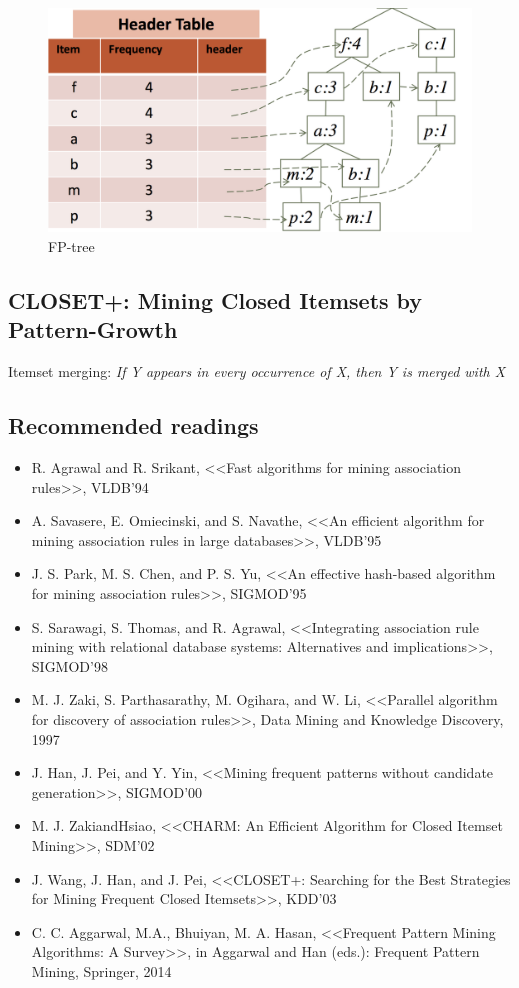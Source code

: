 \begin{figure}[H]
    \centering
    \includegraphics[width=\linewidth]{fptree.png}
    \caption{FP-tree}
\end{figure}

\subsection{CLOSET+: Mining Closed Itemsets by Pattern-Growth}
Itemset merging: \textit{If Y appears in every occurrence of X, then Y
is merged with X}

\subsection{Recommended readings}
\begin{itemize}
\item R. Agrawal and R. Srikant, <<Fast algorithms for mining association rules>>, VLDB'94
\item A. Savasere, E. Omiecinski, and S. Navathe, <<An efficient algorithm for mining association rules in large
databases>>, VLDB'95
\item J. S. Park, M. S. Chen, and P. S. Yu, <<An effective hash-based algorithm for mining association rules>>, SIGMOD'95
\item S. Sarawagi, S. Thomas, and R. Agrawal, <<Integrating association rule mining with relational database systems: Alternatives and implications>>, SIGMOD'98
\item M. J. Zaki, S. Parthasarathy, M. Ogihara, and W. Li, <<Parallel algorithm for discovery of association rules>>, Data Mining and Knowledge Discovery, 1997
\item J. Han, J. Pei, and Y. Yin, <<Mining frequent patterns without candidate generation>>, SIGMOD’00
\item M. J. ZakiandHsiao, <<CHARM: An Efficient Algorithm for Closed Itemset Mining>>, SDM'02
\item J. Wang, J. Han, and J. Pei, <<CLOSET+: Searching for the Best Strategies for Mining Frequent Closed Itemsets>>, KDD'03
\item C. C. Aggarwal, M.A., Bhuiyan, M. A. Hasan, <<Frequent Pattern Mining Algorithms: A Survey>>, in Aggarwal and Han (eds.): Frequent Pattern Mining, Springer, 2014
\end{itemize}